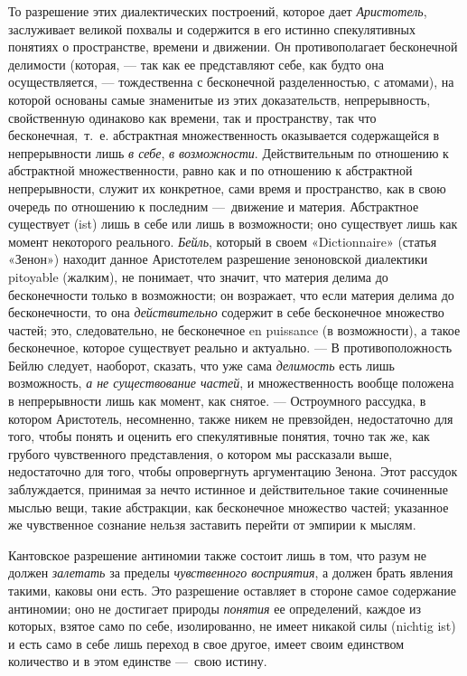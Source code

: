 То разрешение этих диалектических построений, которое дает
{\em Аристотель}, заслуживает великой похвалы и
содержится в его истинно спекулятивных понятиях о пространстве, времени и
движении. Он противополагает бесконечной делимости (которая, — так как ее
представляют себе, как будто она осуществляется, — тождественна с
бесконечной разделенностью, с атомами), на которой основаны самые
знаменитые из этих доказательств, непрерывность, свойственную одинаково как
времени, так и пространству, так что бесконечная,~т.~е. абстрактная
множественность оказывается содержащейся в непрерывности лишь
{\em в себе}, {\em в возможности}.
Действительным по отношению к абстрактной множественности, равно как и по
отношению к абстрактной непрерывности, служит их конкретное, сами время и
пространство, как в свою очередь по отношению к последним —~движение и
материя. Абстрактное существует (ist) лишь в себе или лишь в возможности;
оно существует лишь как момент некоторого реального.
{\em Бейль}, который в своем «Dictionnaire» (статья
«Зенон») находит данное Аристотелем разрешение зеноновской диалектики
pitoyable (жалким), не понимает, что значит, что материя делима до
бесконечности только в возможности; он возражает, что если материя делима
до бесконечности, то она {\em действительно} содержит в
себе бесконечное множество частей; это, следовательно, не бесконечное en
puissance (в возможности), а такое бесконечное, которое существует реально
и актуально. — В противоположность Бейлю следует, наоборот, сказать, что
уже сама {\em делимость} есть лишь возможность,
{\em а не существование частей}, и множественность
вообще положена в непрерывности лишь как момент, как снятое. — Остроумного
рассудка, в котором Аристотель, несомненно, также никем не превзойден,
недостаточно для того, чтобы понять и оценить его спекулятивные понятия,
точно так же, как грубого чувственного представления, о котором мы
рассказали выше, недостаточно для того, чтобы опровергнуть аргументацию
Зенона. Этот рассудок заблуждается, принимая за нечто истинное и
действительное такие сочиненные мыслью вещи, такие абстракции, как
бесконечное множество частей; указанное же чувственное сознание нельзя
заставить перейти от эмпирии к мыслям.

Кантовское разрешение антиномии также состоит лишь в том, что разум не
должен {\em залетать} за пределы
{\em чувственного восприятия}, а должен брать явления
такими, каковы они есть. Это разрешение оставляет в стороне самое
содержание антиномии; оно не достигает природы
{\em понятия} ее определений, каждое из которых, взятое
само по себе, изолированно, не имеет никакой силы (nichtig ist) и есть само
в себе лишь переход в свое другое, имеет своим единством количество и в
этом единстве —~свою истину.

